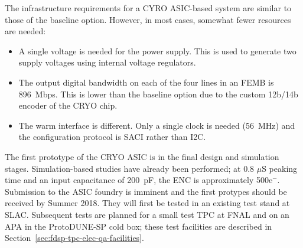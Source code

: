 The infrastructure requirements for a CYRO ASIC-based system are similar to those of the baseline option. However, in most cases, somewhat fewer resources are needed:
\begin{itemize}
\item{A single voltage is needed for the power supply. This is used to generate two supply voltages using internal voltage regulators.}
\item{The output digital bandwidth on each of the four lines in an FEMB is 896~Mbps. This is lower than the baseline option due to the custom 12b/14b encoder of the CRYO chip. }
\item{The warm interface is different. Only a single clock is needed (56~MHz) and the configuration protocol is SACI rather than I2C. }
\end{itemize}

The first prototype of the CRYO ASIC is in the final design and simulation stages. Simulation-based studies have already been performed; at 0.8 $\mu$S peaking time and an input capacitance of 200~pF, the ENC is approximately 500e$^-$.  Submission to the ASIC foundry is imminent and the first protypes should be received by Summer 2018. They will first be tested in an existing test stand at SLAC. Subsequent tests are planned for a small test TPC at FNAL and on an APA in the ProtoDUNE-SP cold box; these test facilities are described in Section~\ref{sec:fdsp-tpc-elec-qa-facilities}.
